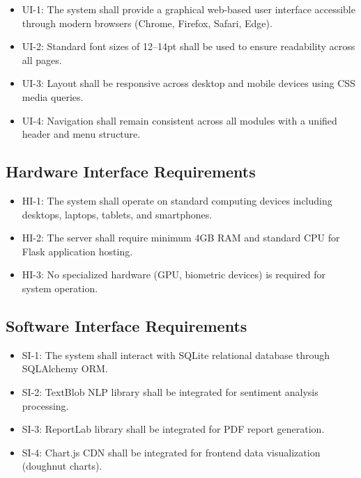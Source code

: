\begin{itemize}
\item UI-1: The system shall provide a graphical web-based user interface accessible through modern browsers (Chrome, Firefox, Safari, Edge).
\item UI-2: Standard font sizes of 12--14pt shall be used to ensure readability across all pages.
\item UI-3: Layout shall be responsive across desktop and mobile devices using CSS media queries.
\item UI-4: Navigation shall remain consistent across all modules with a unified header and menu structure.
\end{itemize}


\subsection{Hardware Interface Requirements}

\begin{itemize}
\item HI-1: The system shall operate on standard computing devices including desktops, laptops, tablets, and smartphones.
\item HI-2: The server shall require minimum 4GB RAM and standard CPU for Flask application hosting.
\item HI-3: No specialized hardware (GPU, biometric devices) is required for system operation.
\end{itemize}


\subsection{Software Interface Requirements}

\begin{itemize}
\item SI-1: The system shall interact with SQLite relational database through SQLAlchemy ORM.
\item SI-2: TextBlob NLP library shall be integrated for sentiment analysis processing.
\item SI-3: ReportLab library shall be integrated for PDF report generation.
\item SI-4: Chart.js CDN shall be integrated for frontend data visualization (doughnut charts).
\end{itemize}


